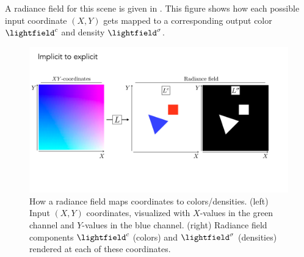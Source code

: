 A radiance field for this scene is given in \fig{\ref{fig:nerfs:flatland_implicit_to_explicit}}. This figure shows how each possible input coordinate $(X,Y)$ gets mapped to a corresponding
output color $\lightfield^c$ and density $\lightfield^{\sigma}$.
\begin{figure}[h!]
    \centerline{
        \includegraphics[width=1.0\linewidth]{figures/nerfs/flatland_implicit_to_explicit_v2.pdf}
    }
    \caption{How a radiance field maps coordinates to colors/densities. (left) Input $(X,Y)$ coordinates, visualized with $X$-values in the green channel and $Y$-values in the blue channel. (right) Radiance field components $\lightfield^c$ (colors) and $\lightfield^\sigma$ (densities) rendered at each of these coordinates.}
    \label{fig:nerfs:flatland_implicit_to_explicit}
\end{figure}





